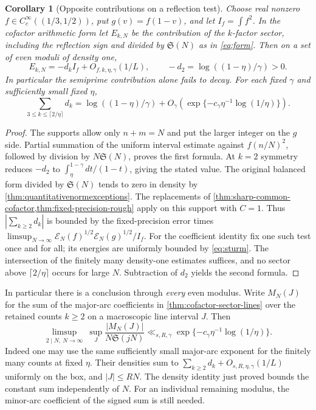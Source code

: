 \documentclass[11pt,a4paper]{article}
\numberwithin{equation}{section}
\newtheorem{corollary}[theorem]{Corollary}
\newcommand{\SSS}{\mathfrak S}
\newcommand{\E}{\mathcal E_N}
\begin{document}
\begin{corollary}[Opposite contributions on a reflection test]
\label{cor:cofactor-sector-compensation}
Choose real nonzero $f\in C_c^\infty((1/3,1/2))$, put
$g(v)=f(1-v)$, and let $I_f=\int f^2$. In the cofactor
arithmetic form let $E_{k,N}$ be the contribution of the
$k$-factor sector, including the reflection sign and divided
by $\SSS(N)$ as in \eqref{eq:form}. Then on a set of even
moduli of density one,
\[
 E_{k,N}=-d_k I_f+O_{f,k,\eta,\gamma}(1/L),\qquad
 -d_2=\log((1-\eta)/\gamma)>0 .
\]
In particular the semiprime contribution alone fails to decay.
For each fixed $\gamma$ and sufficiently small fixed $\eta$,
\[
 \sum_{3\le k\le\lceil 2/\eta\rceil} d_k
 =\log((1-\eta)/\gamma)
       +O_\gamma(\exp\{-c_\gamma\eta^{-1}\log(1/\eta)\}).
\]
\end{corollary}

\begin{proof}
The supports allow only $n+m=N$ and put the larger integer
on the $g$ side. Partial summation of the uniform interval
estimate against $f(n/N)^2$, followed by division by
$N\SSS(N)$, proves the first formula. At $k=2$ symmetry
reduces $-d_2$ to $\int_\eta^{1-\gamma}dt/(1-t)$, giving
the stated value. The original balanced form divided by
$\SSS(N)$ tends to zero in density by
\cref{thm:quantitativenormexceptions}. The replacements of
\cref{thm:sharp-common-cofactor,thm:fixed-precision-rough}
apply on this support with $C=1$. Thus $|\sum_{k\ge2}d_k|$
is bounded by the fixed-precision error
times $\limsup_{N\to\infty}\E(f)^{1/2}\E(g)^{1/2}/I_f$.
For the coefficient identity fix one such test
once and for all; its energies are uniformly bounded by
\eqref{eq:sturm}. The intersection of the finitely many
density-one estimates suffices, and no sector above
$\lceil2/\eta\rceil$ occurs for large $N$. Subtraction of
$d_2$ yields the second formula.
\end{proof}

In particular there is a conclusion through \emph{every} even modulus.
Write $M_N(J)$ for the sum of the major-arc coefficients in
\cref{thm:cofactor-sector-lines} over the retained counts $k\ge2$
on a macroscopic line interval $J$. Then
\[
 \limsup_{2\mid N,\ N\to\infty}\ \sup_J
 \frac{|M_N(J)|}{N\SSS(jN)}
 \ll_{s,R,\gamma}\exp\{-c_\gamma\eta^{-1}\log(1/\eta)\}.
\]
Indeed one may use the same sufficiently small major-arc exponent
for the finitely many counts at fixed $\eta$. Their densities sum
to $\sum_{k\ge2}d_k+O_{s,R,\eta,\gamma}(1/L)$ uniformly on the
box, and $|J|\le RN$. The density identity just proved bounds the
constant sum independently of $N$. For an individual remaining
modulus, the minor-arc coefficient of the signed sum is still needed.
\end{document}
